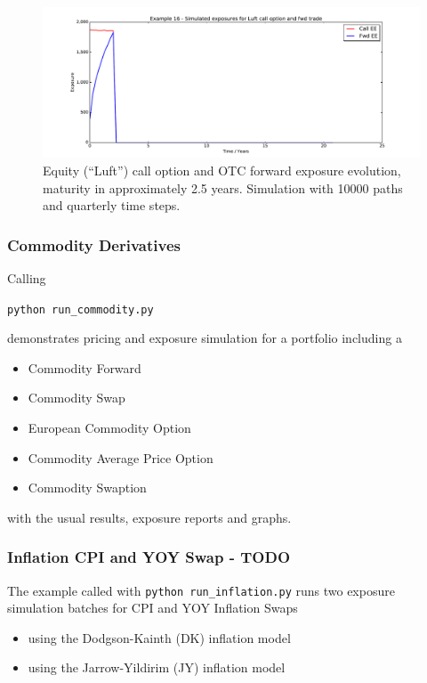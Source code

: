 \begin{figure}[h!]
  \begin{center}
    \includegraphics[scale=0.45]{examples/mpl_eq_call.pdf}
  \end{center}
  \caption{Equity (``Luft'') call option and OTC forward exposure evolution, maturity in approximately 2.5 years. 
    Simulation with 
    10000 paths and quarterly time steps.}
  \label{fig_eq_call}
\end{figure}

\subsubsection{Commodity Derivatives}\label{example:exposure_commodity}

Calling

\medskip
\centerline{\tt python run\_commodity.py}

\medskip
demonstrates pricing and exposure simulation for a portfolio including a
\begin{itemize}
\item Commodity Forward
\item Commodity Swap
\item European Commodity Option
\item Commodity Average Price Option
\item Commodity Swaption
\end{itemize}
with the usual results, exposure reports and graphs. 

\subsubsection{Inflation CPI and YOY Swap - TODO}\label{example:exposure_inflation}

The example called with {\tt python run\_inflation.py} runs two exposure simulation batches for CPI and YOY Inflation Swaps
\begin{itemize}
\item using the Dodgson-Kainth (DK) inflation model
\item using the Jarrow-Yildirim (JY) inflation model
\end{itemize}

